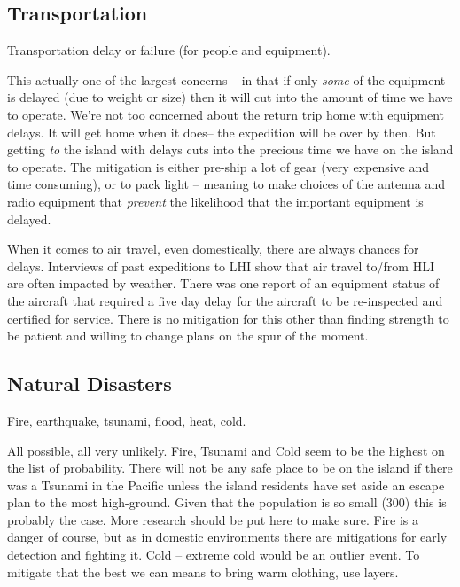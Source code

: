 \documentclass[11pt]{article}
\begin{document}
\subsection{Transportation}

Transportation delay or failure (for people and equipment).
\par

This
actually one of the largest concerns -- in that if only {\textit{some}}
of the equipment is delayed (due to weight or size) then it will 
cut into the amount of time we have to operate.  We're not too concerned
about the return trip home with equipment delays. It will get home when
it does-- the expedition will be over by then.   But getting {\textit{to}}
the island with delays cuts into the precious time we have on the island
to operate.  The mitigation is either pre-ship a lot of gear (very
expensive and time consuming), or to pack light -- meaning to make choices
of the antenna and radio equipment that {\textit{prevent}} the likelihood
that the important equipment is delayed.   
\par
When it comes to air travel, even domestically, there are always 
chances for delays.  Interviews of past expeditions to LHI show that
air travel to/from HLI are often impacted by weather.  There was one
report of an equipment status of the aircraft that required a five
day delay for the aircraft to be re-inspected and certified for
service.  There is no mitigation for this other than finding strength
to be patient and willing to change plans on the spur of the moment.


\subsection{Natural Disasters}

Fire, earthquake, tsunami, flood, heat, cold.
\par

All possible, all very unlikely.  Fire, Tsunami and Cold seem to be
the highest on the list of probability.   There will not be any safe place
to be on the island if there was a Tsunami in the Pacific unless the island
residents have set aside an escape plan to the most high-ground.  Given
that the population is so small (300) this is probably the case.  More 
research should be put here to make sure.   Fire is a danger of course,
but as in domestic environments there are mitigations for early detection
and fighting it.  Cold -- extreme cold would be an outlier event.  To
mitigate that the best we can means to bring warm clothing, use layers.
\end{document}
